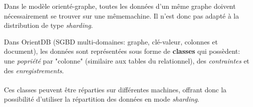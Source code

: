 \item{}
{\faux}
{
Dans le modèle orienté-graphe, toutes les données d'un même graphe doivent nécessairement se trouver sur une mêmemachine. Il n'est donc pas adapté à la distribution de type \textit{sharding}.
}


\item{}
{\vrai}
{Dans OrientDB (SGBD multi-domaines: graphe, clé-valeur, colonnes et document), les données sont représentées sous forme de \textbf{classes} qui possèdent: une \textit{popriété} par "colonne" (similaire aux tables du relationnel), des \textit{contraintes} et des \textit{enregistrements}.
\paragraph{}
Ces classes peuvent être réparties sur différentes machines, offrant donc la possibilité d'utiliser la répartition des données en mode \textit{sharding}.
}


